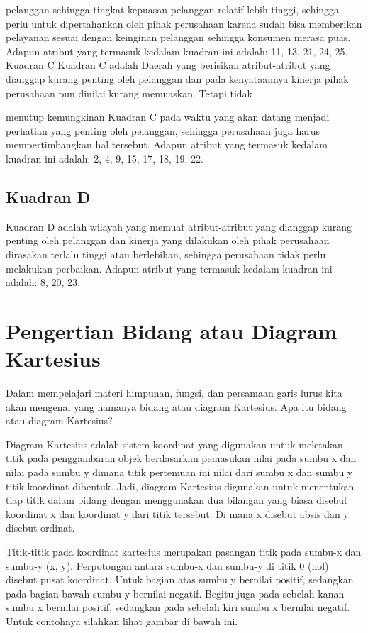 pelanggan sehingga tingkat kepuasan pelanggan relatif lebih tinggi, sehingga perlu untuk dipertahankan oleh pihak perusahaan karena sudah bisa memberikan pelayanan
sesuai dengan keinginan pelanggan sehingga konsumen merasa puas. Adapun atribut yang termasuk kedalam kuadran ini adalah: 11, 13, 21, 24, 25.
Kuadran C
Kuadran C adalah Daerah yang berisikan atribut-atribut yang dianggap kurang penting oleh pelanggan dan pada kenyataannya kinerja pihak perusahaan pun dinilai kurang memuaskan. Tetapi tidak

menutup kemungkinan Kuadran C pada waktu yang akan datang menjadi perhatian yang penting oleh pelanggan, sehingga perusahaan juga harus mempertimbangkan
hal tersebut. Adapun atribut yang termasuk kedalam kuadran ini adalah: 2, 4, 9, 15, 17, 18, 19, 22.
\subsection{Kuadran D}
Kuadran D adalah wilayah yang memuat atribut-atribut yang dianggap kurang penting oleh pelanggan dan kinerja yang dilakukan oleh pihak perusahaan dirasakan
terlalu tinggi atau berlebihan, sehingga perusahaan tidak perlu melakukan perbaikan. Adapun atribut yang termasuk kedalam kuadran ini adalah: 8, 20, 23.

\section{Pengertian Bidang atau Diagram Kartesius}

Dalam mempelajari materi himpunan, fungsi, dan persamaan garis lurus kita akan mengenal yang namanya bidang atau diagram Kartesius. Apa itu bidang atau diagram Kartesius?

Diagram Kartesius adalah sistem koordinat yang digunakan untuk meletakan titik pada penggambaran objek berdasarkan pemasukan nilai pada sumbu x dan nilai pada sumbu y dimana titik pertemuan ini nilai dari sumbu x dan sumbu y titik koordinat dibentuk. Jadi, diagram Kartesius digunakan untuk menentukan tiap titik dalam bidang dengan menggunakan dua bilangan yang biasa disebut koordinat x dan koordinat y dari titik tersebut. Di mana x disebut absis dan y disebut ordinat.


Titik-titik pada koordinat kartesius merupakan pasangan titik pada sumbu-x dan sumbu-y (x, y). Perpotongan antara sumbu-x dan sumbu-y di titik 0 (nol) disebut pusat koordinat. Untuk bagian atas sumbu y bernilai positif, sedangkan pada bagian bawah sumbu y bernilai negatif. Begitu juga pada sebelah kanan sumbu x bernilai positif, sedangkan pada sebelah kiri sumbu x bernilai negatif. Untuk contohnya silahkan lihat gambar di bawah ini. 

